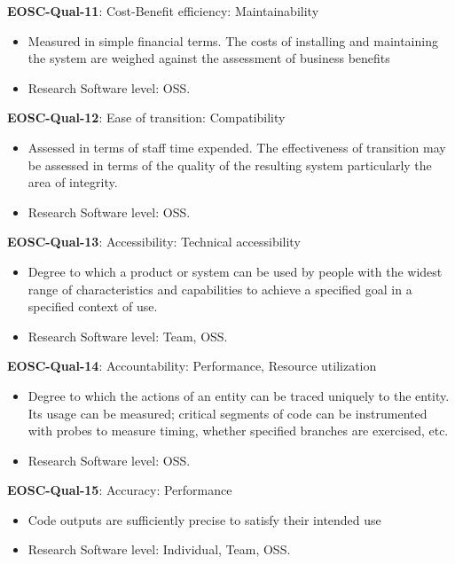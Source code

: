 \textbf{EOSC-Qual-11}: Cost-Benefit efficiency: Maintainability

\begin{itemize}
    \item Measured in simple financial terms. The costs of installing and maintaining the system are weighed against the assessment of business benefits \cite{gillies_modelling_1992}
    \item Research Software level: OSS.
\end{itemize}

\textbf{EOSC-Qual-12}: Ease of transition: Compatibility

\begin{itemize}
    \item Assessed in terms of staff time expended. The effectiveness of transition may be assessed in terms of the quality of the resulting system particularly the area of integrity. \cite{iso_25010_2011_2017,gillies_modelling_1992}
    \item Research Software level: OSS.
\end{itemize}

\textbf{EOSC-Qual-13}: Accessibility: Technical accessibility

\begin{itemize}
    \item Degree to which a product or system can be used by people with the widest range of characteristics and
capabilities to achieve a specified goal in a specified context of use. \cite{iso_25010_2011_2017,boehm_quantitative_1976}
    \item Research Software level: Team, OSS.
\end{itemize}

\textbf{EOSC-Qual-14}: Accountability: Performance, Resource utilization

\begin{itemize}
    \item Degree to which the actions of an entity can be traced uniquely to the entity. Its usage can be measured; critical segments of code can be instrumented with probes to measure timing, whether specified branches are exercised, etc. \cite{iso_25010_2011_2017,boehm_quantitative_1976}
    \item Research Software level: OSS.
\end{itemize}

\textbf{EOSC-Qual-15}: Accuracy: Performance

\begin{itemize}
    \item Code outputs are sufficiently precise to satisfy their intended use \cite{boehm_quantitative_1976}
    \item Research Software level: Individual, Team, OSS.
\end{itemize}

